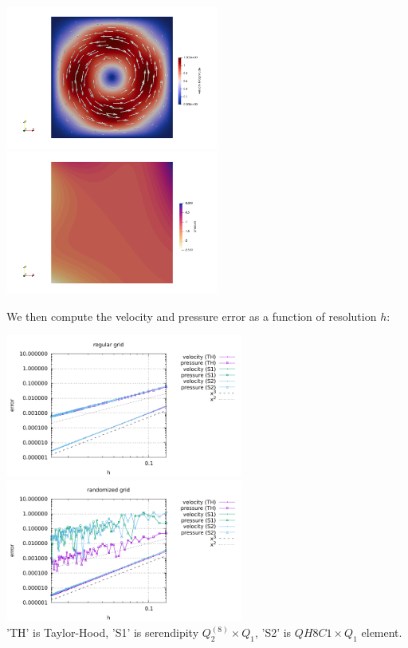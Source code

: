 \begin{center}
\includegraphics[width=7cm]{python_codes/fieldstone_52/images/vel}
\includegraphics[width=7cm]{python_codes/fieldstone_52/images/press}
\end{center}


We then compute the velocity and pressure error as a function of resolution $h$:

\begin{center}
\includegraphics[width=7.8cm]{python_codes/fieldstone_52/images/errors_reg.pdf}
\includegraphics[width=7.8cm]{python_codes/fieldstone_52/images/errors_rand.pdf}\\
{\captionfont 'TH' is Taylor-Hood, 'S1' is serendipity $Q_2^{(8)}\times Q_1$, 'S2' is $QH8C1\times Q_1$ element.}
\end{center}

